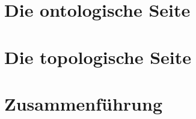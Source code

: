 \documentclass[ twoside,openright,titlepage,numbers=noenddot,%
                headinclude,footinclude,cleardoublepage=empty,abstract=on,
                BCOR=5mm,paper=a4,fontsize=11pt
                ]{scrreprt}
\begin{document}
\frenchspacing
\raggedbottom
{} %
\pagestyle{plain}





\cleardoublepage
\cleardoublepage
\cleardoublepage



\cleardoublepage
\pagestyle{scrheadings}
\cleardoublepage



\part{Die ontologische Seite}





\part{Die topologische Seite}





\part{Zusammenführung}
\end{document}
